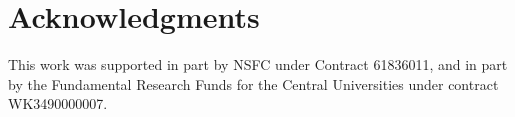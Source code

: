 \documentclass{article} %
\begin{document}
\section*{Acknowledgments}
This work was supported in part by NSFC under Contract 61836011, and in part by the Fundamental Research Funds for the Central Universities under contract WK3490000007.








\end{document}
